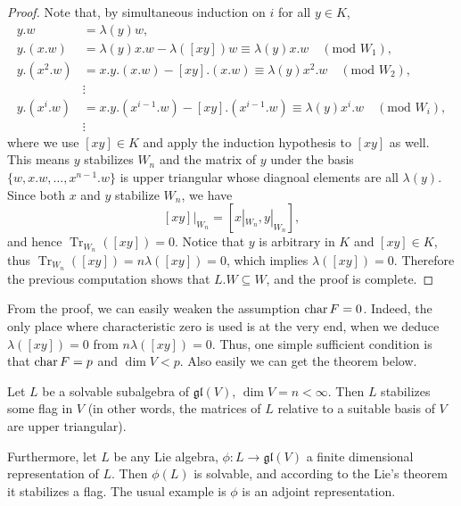 \begin{proof}
    Note that, by simultaneous induction on $i$ for all $y\in K$,
    \begin{equation*}
        \begin{aligned}
        y.w&=\lambda(y)w, \\
        y.(x.w)&=\lambda(y)x.w-\lambda([xy])w \equiv \lambda(y)x.w \quad (\text{mod } W_{1}), \\
        y.(x^2.w)&=x.y.(x.w)-[xy].(x.w) \equiv \lambda(y)x^2.w \quad (\text{mod } W_{2}), \\
        &\vdots \\
        y.(x^i.w)&=x.y.(x^{i-1}.w)-[xy].(x^{i-1}.w) \equiv \lambda(y)x^i.w \quad (\text{mod } W_{i}),\\
        &\vdots
        \end{aligned}
    \end{equation*}
    where we use $[xy]\in K$ and apply the induction hypothesis to $[xy]$ as well. This means $y$ stabilizes $W_{n}$ and the matrix of $y$ under the basis $\{w,x.w, \ldots,x^{n-1}.w\}$ is upper triangular whose diagnoal elements are all $\lambda(y)$. Since both $x$ and $y$ stabilize $W_n$, we have
    \[
        [xy]|_{W_n}=[x|_{W_n},y|_{W_n}],
    \]
    and hence $\operatorname{Tr}_{W_n}([xy])=0$. Notice that $y$ is arbitrary in $K$ and $[xy] \in K$, thus $\operatorname{Tr}_{W_{n}}([xy])=n\lambda([xy])=0$, which implies $\lambda([xy])=0$. Therefore the previous computation shows that $L.W\subseteq W$, and the proof is complete.
\end{proof}
\begin{remark}
    From the proof, we can easily weaken the assumption $\operatorname{char} F=0$. Indeed, the only place where characteristic zero is used is at the very end, when we deduce $\lambda([xy])=0$ from $n\lambda([xy])=0$. Thus, one simple sufficient condition is that $\operatorname{char} F=p$ and $\operatorname{dim}V<p$. Also easily we can get the theorem below.
\end{remark}

\begin{corollary}[Lie]
    Let $L$ be a solvable subalgebra of $\mathfrak{gl}(V)$, $\operatorname{dim}V=n<\infty$. Then $L$ stabilizes some flag in $V$ (in other words, the matrices of $L$ relative to a suitable basis of $V$ are upper triangular).
\end{corollary}

Furthermore, let $L$ be any Lie algebra, $\phi:L\to \mathfrak{gl}(V)$ a finite dimensional representation of $L$. Then $\phi(L)$ is solvable, and according to the Lie's theorem it stabilizes a flag. The usual example is $\phi$ is an adjoint representation.

